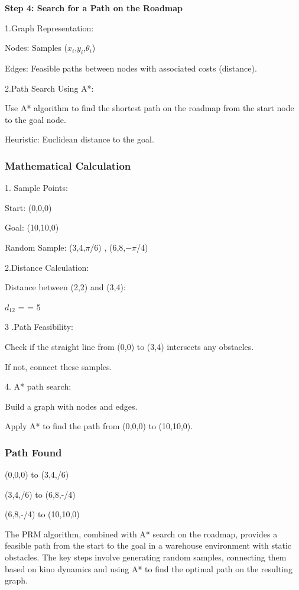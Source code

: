 \documentclass[9pt,a4paper,twoside]{rho-class/rho}
\begin{document}
    \textbf{Step 4: Search for a Path on the Roadmap}

    1.Graph Representation:

    Nodes: Samples ($x_i$,$y_i$,$\theta_i$)

    Edges: Feasible paths between nodes with associated costs (distance).

    2.Path Search Using A*:

    Use A* algorithm to find the shortest path on the roadmap from the start node to the goal node.

    Heuristic: Euclidean distance to the goal.

    \subsubsection{Mathematical Calculation}

    1. Sample Points:

    Start: (0,0,0)

    Goal: (10,10,0)

    Random Sample: (3,4,$\pi$/6) , (6,8,−$\pi$/4)

    2.Distance Calculation:

    Distance between (2,2) and (3,4): 

    $d_12$ = = 5

    3  .Path Feasibility:

    Check if the straight line from (0,0) to (3,4) intersects any obstacles.

    If not, connect these samples.

    4. A* path search:

    Build a graph with nodes and edges.

    Apply A* to find the path from (0,0,0) to (10,10,0).

    \subsubsection{Path Found}

    (0,0,0) to (3,4,/6)

    (3,4,/6) to (6,8,-/4)

    (6,8,-/4) to (10,10,0)

    The PRM algorithm, combined with A* search on the roadmap, provides a feasible path from the start to the goal in a warehouse environment with static obstacles. The key steps involve generating random samples, connecting them based on kino dynamics and using A* to find the optimal path on the resulting graph.
\end{document}
